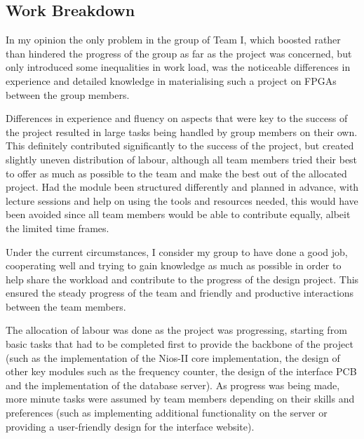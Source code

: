 \subsection{Work Breakdown}
\label{sec:work_breakdown}

%

In my opinion the only problem in the group of Team I, which boosted rather than hindered the progress of the group as far as the project was concerned, but only introduced some inequalities in work load, was the noticeable differences in experience and detailed knowledge in materialising such a project on FPGAs between the group members.

Differences in experience and fluency on aspects that were key to the success of the project resulted in large tasks being handled by group members on their own. This definitely contributed significantly to the success of the project, but created slightly uneven distribution of labour, although all team members tried their best to offer as much as possible to the team and make the best out of the allocated project. Had the module been structured differently and planned in advance, with lecture sessions and help on using the tools and resources needed, this would have been avoided since all team members would be able to contribute equally, albeit the limited time frames.

Under the current circumstances, I consider my group to have done a good job, cooperating well and trying to gain knowledge as much as possible in order to help share the workload and contribute to the progress of the design project. This ensured the steady progress of the team and friendly and productive interactions between the team members.

The allocation of labour was done as the project was progressing, starting from basic tasks that had to be completed first to provide the backbone of the project (such as the implementation of the Nios-II core implementation, the design of other key modules such as the frequency counter, the design of the interface PCB and the implementation of the database server). As progress was being made, more minute tasks were assumed by team members depending on their skills and preferences (such as implementing additional functionality on the server or providing a user-friendly design for the interface website).

